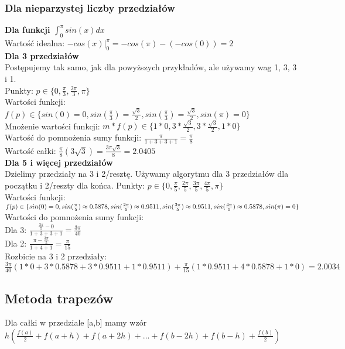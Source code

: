 \documentclass{article}
\begin{document}
\subsubsection{Dla nieparzystej liczby przedziałów}
\textbf{Dla funkcji $\int_{0}^{\pi}sin(x)dx$}\\
Wartość idealna: $-cos(x)|^\pi_0=-cos(\pi)-(-cos(0))=2$\\
\textbf{Dla 3 przedziałów}\\
Postępujemy tak samo, jak dla powyższych przykładów, ale używamy wag 1, 3, 3 i 1.\\
Punkty: $p \in \{0, \frac{\pi}{3}, \frac{2\pi}{3}, \pi\}$\\
Wartości funkcji: $f(p) \in \{sin(0)=0, sin(\frac{\pi}{3})=\frac{\sqrt{3}}{2}, sin(\frac{\pi}{3})=\frac{\sqrt{3}}{2}, sin(\pi)=0\}$\\
Mnożenie wartości funkcji: $m*f(p) \in \{1*0, 3*\frac{\sqrt{3}}{2}, 3*\frac{\sqrt{3}}{2}, 1*0\}$\\
Wartość do pomnożenia sumy funkcji: $\frac{\pi}{1+3+3+1}=\frac{\pi}{8}$\\
Wartość całki: $\frac{\pi}{8}(3\sqrt{3})=\frac{3\pi \sqrt{3}}{8}=2.0405$\\
\textbf{Dla 5 i więcej przedziałów}\\
Dzielimy przedziały na 3 i 2/resztę. Używamy algorytmu dla 3 przedziałów dla początku i 2/reszty dla końca.
Punkty: $p \in \{0, \frac{\pi}{5}, \frac{2\pi}{5}, \frac{3\pi}{5}, \frac{4\pi}{5}, \pi\}$\\
Wartości funkcji: $f(p) \in \{sin(0)=0, sin(\frac{\pi}{5})\approx 0.5878, sin(\frac{2\pi}{5})\approx 0.9511, sin(\frac{3\pi}{5})\approx 0.9511,\\ sin(\frac{4\pi}{5})\approx 0.5878, sin(\pi)=0\}$\\
Wartości do pomnożenia sumy funkcji:\\
Dla 3: $\frac{\frac{3\pi}{5}-0}{1+3+3+1}=\frac{3\pi}{40}$\\
Dla 2: $\frac{\pi-\frac{3\pi}{5}}{1+4+1}=\frac{\pi}{15}$\\
Rozbicie na 3 i 2 przedziały: $\frac{3\pi}{40}(1*0+3*0.5878+3*0.9511+1*0.9511) + \frac{\pi}{15}(1*0.9511+4*0.5878+1*0)=2.0034$

\subsection{Metoda trapezów}
Dla całki w przedziale [a,b] mamy wzór $h(\frac{f(a)}{2}+f(a+h)+f(a+2h)+...+f(b-2h)+f(b-h)+\frac{f(b)}{2})$
\end{document}
